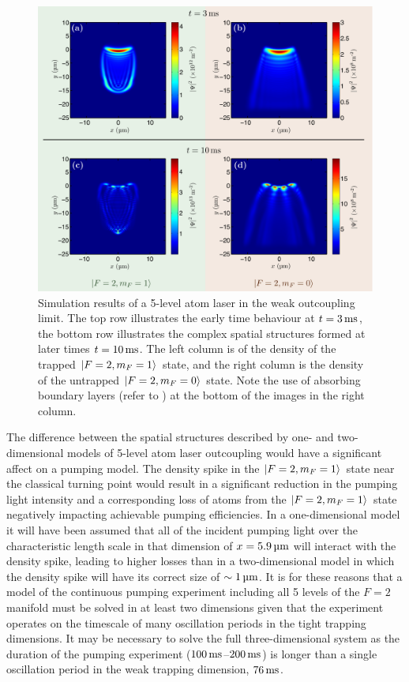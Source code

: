 \begin{figure}
    \centering
    \includegraphics[width=14cm]{5LevelAtomLaserSnapshots}
    \caption{Simulation results of a 5-level atom laser in the weak outcoupling limit.  The top row illustrates the early time behaviour at $t=\unit[3]{ms}$, the bottom row illustrates the complex spatial structures formed at later times $t = \unit[10]{ms}$.  The left column is of the density of the trapped ${\left|F=2, m_F=1\right>}$ state, and the right column is the density of the untrapped ${\left|F=2, m_F=0\right>}$ state.  Note the use of absorbing boundary layers (refer to ) at the bottom of the images in the right column.}
    \label{OpticalPumping:5LevelAtomLaserSnapshots}
\end{figure}

The difference between the spatial structures described by one- and two-dimensional models of 5-level atom laser outcoupling would have a significant affect on a pumping model.  The density spike in the ${\left|F=2, m_F=1\right>}$ state near the classical turning point would result in a significant reduction in the pumping light intensity and a corresponding loss of atoms from the ${\left|F=2, m_F=1\right>}$ state negatively impacting achievable pumping efficiencies.  In a one-dimensional model it will have been assumed that all of the incident pumping light over the characteristic length scale in that dimension of $x = \unit[5.9]{\micro m}$ will interact with the density spike, leading to higher losses than in a two-dimensional model in which the density spike will have its correct size of $\sim\unit[1]{\micro m}$.  It is for these reasons that a model of the continuous pumping experiment including all 5 levels of the $F=2$ manifold must be solved in at least two dimensions given that the experiment operates on the timescale of many oscillation periods in the tight trapping dimensions.  It may be necessary to solve the full three-dimensional system as the duration of the pumping experiment ($\unit[100]{ms}$--$\unit[200]{ms}$) is longer than a single oscillation period in the weak trapping dimension, $\unit[76]{ms}$.

